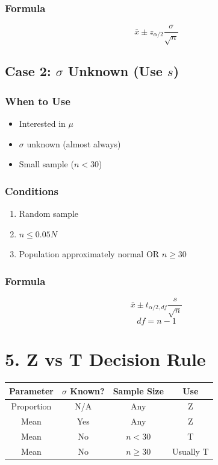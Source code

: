 \documentclass[11pt]{article}
\begin{document}
\subsubsection*{Formula}
\[
\bar{x} \pm z_{\alpha/2} \frac{\sigma}{\sqrt{n}}
\]

\subsection*{Case 2: $\sigma$ Unknown (Use $s$)}

\subsubsection*{When to Use}
\begin{itemize}
    \item Interested in $\mu$
    \item $\sigma$ unknown (almost always)
    \item Small sample ($n < 30$)
\end{itemize}

\subsubsection*{Conditions}
\begin{enumerate}
    \item Random sample
    \item $n \le 0.05N$
    \item Population approximately normal OR $n \ge 30$
\end{enumerate}

\subsubsection*{Formula}
\[
\bar{x} \pm t_{\alpha/2, df} \frac{s}{\sqrt{n}}
\]
\[
df = n - 1
\]

\section*{5. Z vs T Decision Rule}

\begin{center}
\begin{tabular}{cccc}
\toprule
Parameter & $\sigma$ Known? & Sample Size & Use \\
\midrule
Proportion & N/A & Any & Z \\
Mean & Yes & Any & Z \\
Mean & No & $n < 30$ & T \\
Mean & No & $n \ge 30$ & Usually T \\
\bottomrule
\end{tabular}
\end{center}
\end{document}
